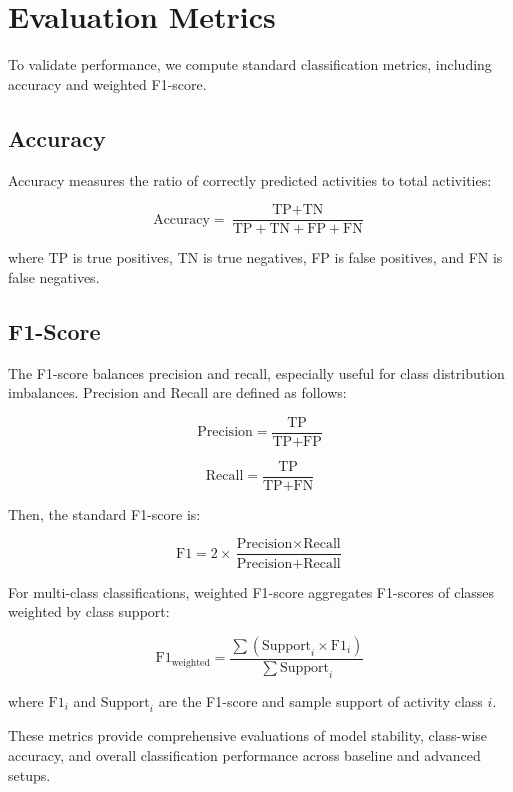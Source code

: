 
\section{Evaluation Metrics}
\label{sec:metrics}

To validate performance, we compute standard classification metrics, including accuracy and weighted F1-score.

\subsection{Accuracy}
\label{subsec:accuracy_metric}

Accuracy measures the ratio of correctly predicted activities to total activities:

\begin{equation}
\label{eq:accuracy}
\text{Accuracy} = \frac{\text{TP} + \text{TN}}{\text{TP} + \text{TN} + \text{FP} + \text{FN}}
\end{equation}

where TP is true positives, TN is true negatives, FP is false positives, and FN is false negatives.

\subsection{F1-Score}
\label{subsec:f1_metric}

The F1-score balances precision and recall, especially useful for class distribution imbalances. Precision and Recall are defined as follows:

\begin{equation}
\label{eq:precision}
\text{Precision} = \frac{\text{TP}}{\text{TP} + \text{FP}}
\end{equation}

\begin{equation}
\label{eq:recall}
\text{Recall} = \frac{\text{TP}}{\text{TP} + \text{FN}}
\end{equation}

Then, the standard F1-score is:

\begin{equation}
\label{eq:f1}
\text{F1} = 2 \times \frac{\text{Precision} \times \text{Recall}}{\text{Precision} + \text{Recall}}
\end{equation}

For multi-class classifications, weighted F1-score aggregates F1-scores of classes weighted by class support:

\begin{equation}
\label{eq:f1_weighted}
\text{F1}_{\text{weighted}} = \frac{\sum (\text{Support}_i \times \text{F1}_i)}{\sum \text{Support}_i}
\end{equation}

where $\text{F1}_i$ and $\text{Support}_i$ are the F1-score and sample support of activity class $i$.

These metrics provide comprehensive evaluations of model stability, class-wise accuracy, and overall classification performance across baseline and advanced setups.
